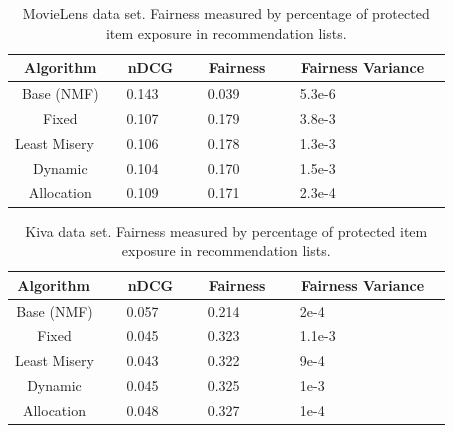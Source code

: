 \begin{table}[htb]
    \centering
    \begin{tabular}{c|l|l|l}
       Algorithm  & \ nDCG \ & \ Fairness \  & \ Fairness Variance \ \\
       \hline
       Base (NMF)       & \ 0.143 & \ 0.039 & \ 5.3e-6 \  \\
       Fixed            & \ 0.107 & \ 0.179 & \ 3.8e-3 \ \\
       Least Misery \   & \ 0.106 & \ 0.178 & \ 1.3e-3 \ \\
       Dynamic          & \ 0.104 & \ 0.170 & \ 1.5e-3 \ \\
       Allocation       & \ 0.109 & \ 0.171 & \ 2.3e-4 \ \\
    \end{tabular}
    \caption{MovieLens data set. Fairness measured by percentage of protected item exposure in recommendation lists.}
    \label{tab:overall-ML}
\end{table}


\begin{table}[htb]
    \centering
    \begin{tabular}{c|l|l|l}
       Algorithm  \ & \ nDCG \ & \ Fairness \ & \ Fairness Variance \ \\
       \hline
       Base (NMF)   \ & \ 0.057 & \ 0.214 & \ 2e-4\\
       Fixed        \ & \ 0.045 & \ 0.323 & \ 1.1e-3\\
       Least Misery \ & \ 0.043 & \ 0.322 & \ 9e-4\\
       Dynamic      \ & \ 0.045 & \ 0.325 & \ 1e-3\\
       Allocation   \ & \ 0.048 & \ 0.327 & \ 1e-4\\
    \end{tabular}
    \caption{Kiva data set. Fairness measured by percentage of protected item exposure in recommendation lists.}
    \label{tab:overall-Kiva}
\end{table}


